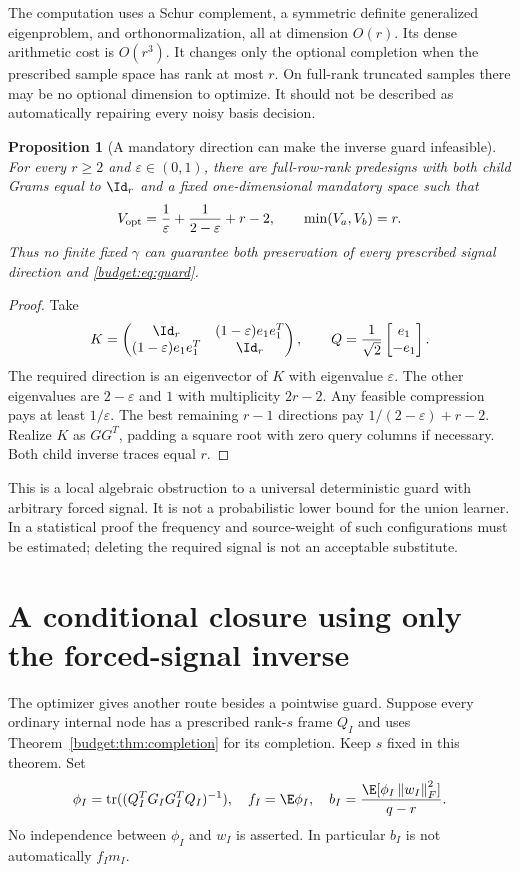\documentclass[11pt,oneside,openany,a4paper]{book}
\numberwithin{equation}{chapter}
\newtheorem{proposition}[theorem]{Proposition}
\theoremstyle{definition}
\theoremstyle{remark}
\newcommand{\F}[1]{\left\lVert#1\right\rVert_F}
\DeclareMathOperator{\tr}{tr}\DeclareMathOperator{\rank}{rank}
\begin{document}
The computation uses a Schur complement, a symmetric definite generalized eigenproblem, and orthonormalization, all at dimension $O(r)$. Its dense arithmetic cost is $O(r^3)$. It changes only the optional completion when the prescribed sample space has rank at most $r$. On full-rank truncated samples there may be no optional dimension to optimize. It should not be described as automatically repairing every noisy basis decision.

\begin{proposition}[A mandatory direction can make the inverse guard infeasible]\label{budget:prop:infeasible}
For every $r\ge2$ and $\varepsilon\in(0,1)$, there are full-row-rank predesigns with both child Grams equal to $\Id_r$ and a fixed one-dimensional mandatory space such that
\begin{equation}\label{budget:eq:impossible}
 V_{\rm opt}=\frac1\varepsilon+\frac1{2-\varepsilon}+r-2,
 \qquad \min(V_a,V_b)=r.
\end{equation}
Thus no finite fixed $\gamma$ can guarantee both preservation of every prescribed signal direction and \eqref{budget:eq:guard}.
\end{proposition}
\begin{proof}
Take
\[
 K=\begin{pmatrix}\Id_r&(1-\varepsilon)e_1e_1^T\\
 (1-\varepsilon)e_1e_1^T&\Id_r\end{pmatrix},\qquad
 Q=\frac1{\sqrt2}\begin{bmatrix}e_1\\-e_1\end{bmatrix}.
\]
The required direction is an eigenvector of $K$ with eigenvalue $\varepsilon$. The other eigenvalues are $2-\varepsilon$ and $1$ with multiplicity $2r-2$. Any feasible compression pays at least $1/\varepsilon$. The best remaining $r-1$ directions pay $1/(2-\varepsilon)+r-2$. Realize $K$ as $GG^T$, padding a square root with zero query columns if necessary. Both child inverse traces equal $r$.
\end{proof}

This is a local algebraic obstruction to a universal deterministic guard with arbitrary forced signal. It is not a probabilistic lower bound for the union learner. In a statistical proof the frequency and source-weight of such configurations must be estimated; deleting the required signal is not an acceptable substitute.

\section{A conditional closure using only the forced-signal inverse}\label{budget:sec:forced}
The optimizer gives another route besides a pointwise guard. Suppose every ordinary internal node has a prescribed rank-$s$ frame $Q_I$ and uses Theorem~\ref{budget:thm:completion} for its completion. Keep $s$ fixed in this theorem. Set
\[
 \phi_I=\tr((Q_I^TG_IG_I^TQ_I)^{-1}),\quad f_I=\E\phi_I,\quad
 b_I=\frac{\E[\phi_I\F{w_I}^2]}{q-r}.
\]
No independence between $\phi_I$ and $w_I$ is asserted. In particular $b_I$ is not automatically $f_Im_I$.
\end{document}
